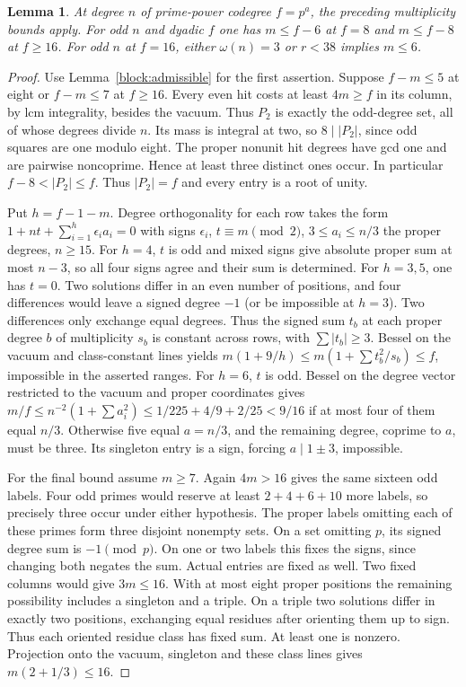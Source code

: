 \documentclass[11pt]{amsart}
\numberwithin{equation}{section}
\newtheorem{lemma}[theorem]{Lemma}
\theoremstyle{definition}
\theoremstyle{plain}
\begin{document}
\begin{lemma}\label{result:saturation}
At degree $n$ of prime-power codegree $f=p^a$, the preceding multiplicity
bounds apply. For odd $n$ and dyadic $f$ one has $m\le f-6$ at $f=8$
and $m\le f-8$ at $f\ge16$. For odd $n$ at $f=16$, either $\omega(n)=3$ or $r<38$ implies $m\le6$.
\end{lemma}
\begin{proof}
Use Lemma~\ref{block:admissible} for the first assertion. Suppose
$f-m\le5$ at eight or $f-m\le7$ at $f\ge16$. Every even hit costs
at least $4m\ge f$ in its column, by lcm integrality, besides the
vacuum. Thus $P_2$ is exactly the odd-degree set, all of whose degrees
divide $n$. Its mass is integral at two, so $8\mid |P_2|$, since
odd squares are one modulo eight. The proper nonunit hit degrees have
gcd one and are pairwise noncoprime. Hence at least three distinct
ones occur. In particular $f-8<|P_2|\le f$. Thus $|P_2|=f$ and
every entry is a root of unity.

Put $h=f-1-m$. Degree orthogonality for each row takes the form
$1+nt+\sum_{i=1}^h\epsilon_i a_i=0$ with signs $\epsilon_i$,
$t\equiv m\pmod2$, $3\le a_i\le n/3$ the proper degrees, $n\ge15$.
For $h=4$, $t$ is odd and mixed signs give absolute proper sum
at most $n-3$, so all four signs agree and their sum is determined.
For $h=3,5$, one has $t=0$. Two solutions differ in an even number
of positions, and four differences would leave a signed degree $-1$
(or be impossible at $h=3$). Two differences only exchange equal
degrees. Thus the signed sum $t_b$ at each proper degree $b$ of
multiplicity $s_b$ is constant across rows, with $\sum|t_b|\ge3$.
Bessel on the vacuum and class-constant lines yields
$m(1+9/h)\le m(1+\sum t_b^2/s_b)\le f$, impossible in the asserted
ranges. For $h=6$, $t$ is odd. Bessel on the degree vector restricted
to the vacuum and proper coordinates gives
$m/f\le n^{-2}(1+\sum a_i^2)\le1/225+4/9+2/25<9/16$ if at most
four of them equal $n/3$. Otherwise five equal $a=n/3$, and the
remaining degree, coprime to $a$, must be three. Its singleton entry
is a sign, forcing $a\mid1\pm3$, impossible.

For the final bound assume $m\ge7$. Again $4m>16$ gives the same
sixteen odd labels. Four odd primes would reserve at least
$2+4+6+10$ more labels, so precisely three occur under either
hypothesis. The proper labels omitting each of these primes form
three disjoint nonempty sets. On a set omitting $p$, its signed
degree sum is $-1\pmod p$. On one or two labels this fixes the
signs, since changing both negates the sum. Actual entries are
fixed as well. Two fixed columns would give $3m\le16$. With at
most eight proper positions the remaining possibility includes a
singleton and a triple. On a triple two solutions differ in exactly
two positions, exchanging equal residues after orienting them up to
sign. Thus each oriented residue class has fixed sum. At least one
is nonzero. Projection onto the vacuum, singleton and these class
lines gives $m(2+1/3)\le16$.
\end{proof}
\end{document}
